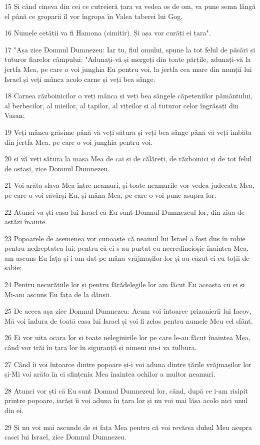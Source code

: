 \par 15 Și când cineva din cei ce cutreieră țara va vedea os de om, va pune semn lângă el până ce groparii îl vor îngropa în Valea taberei lui Gog.
\par 16 Numele cetății va fi Hamona (cimitir). Și așa vor curăți ei țara".
\par 17 "Așa zice Domnul Dumnezeu: Iar tu, fiul omului, spune la tot felul de păsări și tuturor fiarelor câmpului: "Adunați-vă și mergeți din toate părțile, adunați-vă la jertfa Mea, pe care o voi junghia Eu pentru voi, la jertfa cea mare din munții lui Israel și veți mânca acolo carne și veți bea sânge.
\par 18 Carnea războinicilor o veți mânca și veți bea sângele căpeteniilor pământului, al berbecilor, al mieilor, al țapilor, al vițeilor și al tuturor celor îngrășați din Vasan;
\par 19 Veți mânca grăsime până vă veți sătura și veți bea sânge până vă veți îmbăta din jertfa Mea, pe care o voi junghia pentru voi.
\par 20 și vă veți sătura la masa Mea de cai și de călăreți, de războinici și de tot felul de ostași, zice Domnul Dumnezeu.
\par 21 Voi arăta slava Mea între neamuri, și toate neamurile vor vedea judecata Mea, pe care o voi săvârși Eu, și mâna Mea, pe care o voi pune asupra lor.
\par 22 Atunci va ști casa lui Israel că Eu sunt Domnul Dumnezeul lor, din ziua de astăzi înainte.
\par 23 Popoarele de asemenea vor cunoaște că neamul lui Israel a fost dus în robie pentru nedreptatea lui; pentru că ei s-au purtat cu necredincioșie înaintea Mea, am ascuns Eu fața și i-am dat pe mâna vrăjmașilor lor și au căzut ei cu toții de sabie;
\par 24 Pentru necurățiile lor și pentru fărădelegile lor am făcut Eu aceasta cu ei și Mi-am ascuns Eu fața de la dânșii.
\par 25 De aceea așa zice Domnul Dumnezeu: Acum voi întoarce prizonierii lui Iacov, Mă voi îndura de toată casa lui Israel și voi fi zelos pentru numele Meu cel sfânt.
\par 26 Ei vor uita ocara lor și toate nelegiuirile lor pe care le-au făcut înaintea Mea, când vor trăi în țara lor în siguranță și nimeni nu-i va tulbura.
\par 27 Când îi voi întoarce dintre popoare și-i voi aduna dintre țările vrăjmașilor lor și-Mi voi arăta în ei sfințenia Mea înaintea ochilor a multor neamuri.
\par 28 Atunci vor ști că Eu sunt Domnul Dumnezeul lor, când, după ce i-am risipit printre popoare, iarăși îi voi aduna în țara lor și nu voi mai lăsa acolo nici unul din ei.
\par 29 Și nu voi mai ascunde de ei fața Mea pentru că voi revărsa duhul Meu asupra casei lui Israel, zice Domnul Dumnezeu.

